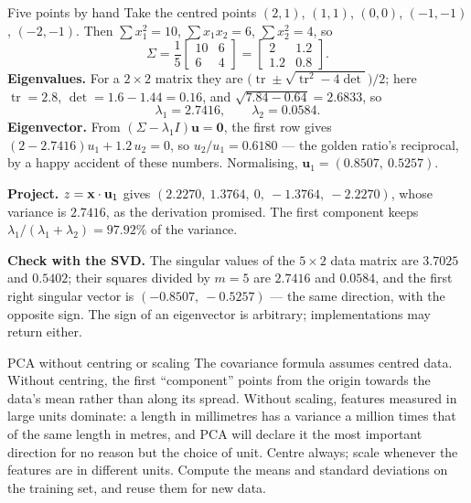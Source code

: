 \begin{workedexample}{Five points by hand}
Take the centred points $(2,1)$, $(1,1)$, $(0,0)$, $(-1,-1)$, $(-2,-1)$. Then
$\sum x_1^2 = 10$, $\sum x_1x_2 = 6$, $\sum x_2^2 = 4$, so
\[
  \Sigma = \frac15\begin{bmatrix}10 & 6\\ 6 & 4\end{bmatrix}
         = \begin{bmatrix}2 & 1.2\\ 1.2 & 0.8\end{bmatrix}.
\]
\textbf{Eigenvalues.} For a $2\times2$ matrix they are
$\bigl(\operatorname{tr}\pm\sqrt{\operatorname{tr}^2 - 4\det}\bigr)/2$; here
$\operatorname{tr} = 2.8$, $\det = 1.6 - 1.44 = 0.16$, and
$\sqrt{7.84 - 0.64} = 2.6833$, so
\[
  \lambda_1 = 2.7416, \qquad \lambda_2 = 0.0584 .
\]
\textbf{Eigenvector.} From $(\Sigma - \lambda_1 I)\mathbf{u} = \mathbf{0}$, the
first row gives $(2 - 2.7416)u_1 + 1.2\,u_2 = 0$, so $u_2/u_1 = 0.6180$ --- the
golden ratio's reciprocal, by a happy accident of these numbers. Normalising,
$\mathbf{u}_1 = (0.8507,\ 0.5257)$.

\textbf{Project.} $z = \mathbf{x}\cdot\mathbf{u}_1$ gives
$(2.2270,\ 1.3764,\ 0,\ -1.3764,\ -2.2270)$, whose variance is $2.7416$, as the
derivation promised. The first component keeps $\lambda_1/(\lambda_1 +
\lambda_2) = 97.92\%$ of the variance.

\textbf{Check with the SVD.} The singular values of the $5\times2$ data matrix are
$3.7025$ and $0.5402$; their squares divided by $m = 5$ are $2.7416$ and $0.0584$,
and the first right singular vector is $(-0.8507,\ -0.5257)$ --- the same
direction, with the opposite sign. The sign of an eigenvector is arbitrary;
implementations may return either.
\end{workedexample}

\begin{pitfall}{PCA without centring or scaling}
The covariance formula assumes centred data. Without centring, the first
``component'' points from the origin towards the data's mean rather than along its
spread. Without scaling, features measured in large units dominate: a length in
millimetres has a variance a million times that of the same length in metres, and
PCA will declare it the most important direction for no reason but the choice of
unit. Centre always; scale whenever the features are in different units. Compute
the means and standard deviations on the training set, and reuse them for new
data.
\end{pitfall}

